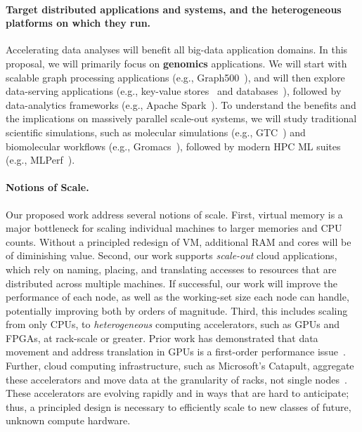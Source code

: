 \paragraph{Target distributed applications and systems, and the heterogeneous platforms on which they run.}

Accelerating data analyses will benefit all big-data application domains.  In
this proposal, we will primarily focus on \textbf{genomics} applications. We will
start with scalable graph processing applications (e.g.,
Graph500~\cite{graph500}), and will then explore data-serving applications
(e.g., key-value stores~\cite{lakshman2010cassandra, papyruskv-kim-sc17} and
databases~\cite{MySQL}), followed by data-analytics frameworks (e.g., Apache
Spark~\cite{Zaharia:Spark:HotCloud10}). To understand the benefits and the
implications on massively parallel scale-out systems, we will study traditional
scientific simulations, such as molecular simulations (e.g., GTC~\cite{GTC}) and
biomolecular workflows (e.g., Gromacs~\cite{GROMACS}), followed by modern HPC ML
suites (e.g., MLPerf~\cite{MLPerf}).

\paragraph{Notions of Scale.}  Our proposed work address several notions of
scale.  First, virtual memory is a major bottleneck for scaling individual
machines to larger memories and CPU counts.  Without a principled redesign of
VM, additional RAM and cores will be of diminishing value.  Second, our work
supports \emph{scale-out} cloud applications, which rely on naming, placing, and
translating accesses to resources that are distributed across multiple machines.
If successful, our work will improve the performance of each node, as well as
the working-set size each node can handle, potentially improving both by orders
of magnitude.  Third, this includes scaling from only CPUs, to {\em
heterogeneous} computing accelerators, such as GPUs and FPGAs, at rack-scale or
greater.  Prior work has demonstrated that data movement and address translation
in GPUs is a first-order performance issue~\cite{pichai:gpu,
power:gpummu,rossbach:ptask}. Further, cloud computing infrastructure, such as
Microsoft's Catapult, aggregate these accelerators and move data  at the
granularity of racks, not single nodes~\cite{putnam:catapult}.  These
accelerators are evolving rapidly and in ways that are hard to anticipate; thus,
a principled design is necessary to efficiently scale to new classes of future,
unknown compute hardware.


